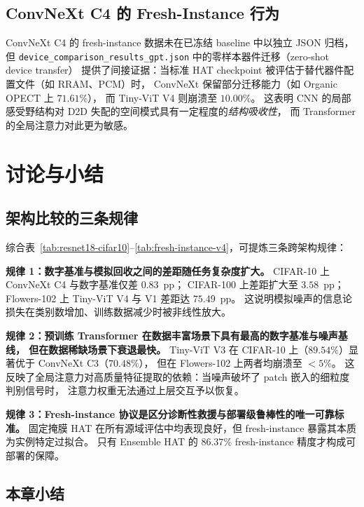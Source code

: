 \subsection{ConvNeXt C4 的 Fresh-Instance 行为}

ConvNeXt C4 的 fresh-instance 数据未在已冻结 baseline 中以独立 JSON 归档，
但 \texttt{device\_comparison\_results\_gpt.json} 中的零样本器件迁移（zero-shot device transfer）
提供了间接证据：当标准 HAT checkpoint 被评估于替代器件配置文件（如 RRAM、PCM）时，
ConvNeXt 保留部分迁移能力（如 Organic OPECT 上 $71.61\%$），
而 Tiny-ViT V4 则崩溃至 $10.00\%$。
这表明 CNN 的局部感受野结构对 D2D 失配的空间模式具有一定程度的\emph{结构吸收性}，
而 Transformer 的全局注意力对此更为敏感。

\section{讨论与小结}

\subsection{架构比较的三条规律}

综合表~\ref{tab:resnet18-cifar10}--\ref{tab:fresh-instance-v4}，可提炼三条跨架构规律：

\textbf{规律 1：数字基准与模拟回收之间的差距随任务复杂度扩大。}
CIFAR-10 上 ConvNeXt C4 与数字基准仅差 $0.83$~pp；
CIFAR-100 上差距扩大至 $3.58$~pp；
Flowers-102 上 Tiny-ViT V4 与 V1 差距达 $75.49$~pp。
这说明模拟噪声的信息论损失在类别数增加、训练数据减少时被非线性放大。

\textbf{规律 2：预训练 Transformer 在数据丰富场景下具有最高的数字基准与噪声基线，
但在数据稀缺场景下衰退最快。}
Tiny-ViT V3 在 CIFAR-10 上（$89.54\%$）显著优于 ConvNeXt C3（$70.48\%$），
但在 Flowers-102 上两者均崩溃至 $<5\%$。
这反映了全局注意力对高质量特征提取的依赖：当噪声破坏了 patch 嵌入的细粒度判别信号时，
注意力权重无法通过上层交互予以恢复。

\textbf{规律 3：Fresh-instance 协议是区分诊断性救援与部署级鲁棒性的唯一可靠标准。}
固定掩膜 HAT 在所有源域评估中均表现良好，但 fresh-instance 暴露其本质为实例特定过拟合。
只有 Ensemble HAT 的 $86.37\%$ fresh-instance 精度才构成可部署的保障。

\subsection{本章小结}


